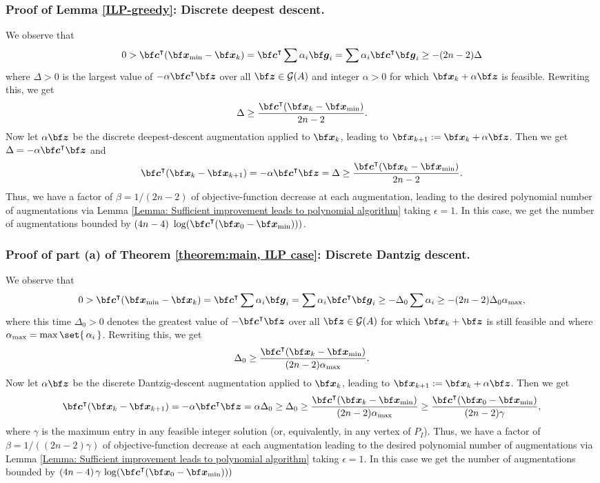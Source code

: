 \documentclass[moor]{informs1hack}              %
\def\Graver{{\mathcal G}}
\def\ve#1{\mathchoice{\mbox{\boldmath$\displaystyle\bf#1$}}
{\mbox{\boldmath$\textstyle\bf#1$}}
{\mbox{\boldmath$\scriptstyle\bf#1$}}
{\mbox{\boldmath$\scriptscriptstyle\bf#1$}}}
\newcommand\vecc{{\ve c}}
\newcommand\veg{{\ve g}}
\newcommand\vex{{\ve x}}
\newcommand\vez{{\ve z}}
\newcommand{\T}{{\intercal}} %
\begin{document}
\subsubsection{Proof of Lemma \ref{ILP-greedy}: Discrete deepest descent.} We observe that
\[
  0>\vecc^\T (\vex_{\min}-\vex_k)
   =\vecc^\T \sum\alpha_i\veg_i
   = \sum\alpha_i\vecc^\T\veg_i
   \geq -(2n-2)\Delta
\]
where $\Delta>0$ is the largest value of $-\alpha\vecc^\T\vez$ over all $\vez\in\Graver(A)$ and integer $\alpha>0$ for which $\vex_k+\alpha\vez$ is feasible. Rewriting this, we get
\[
  \Delta\geq\frac{\vecc^\T (\vex_k-\vex_{\min})}{2n-2}.
\]
Now let $\alpha\vez$ be the discrete deepest-descent augmentation applied to $\vex_k$, leading to $\vex_{k+1}:=\vex_k+\alpha\vez$. Then we get $\Delta=-\alpha\vecc^\T\vez$ and
\[
  \vecc^\T (\vex_k-\vex_{k+1})=-\alpha\vecc^\T\vez=\Delta
  \geq\frac{\vecc^\T (\vex_k-\vex_{\min})}{2n-2}.
\]
Thus, we have a factor of $\beta=1/(2n-2)$ of objective-function decrease at each augmentation, leading to the desired polynomial number of augmentations via Lemma \ref{Lemma: Sufficient improvement leads to polynomial algorithm} taking $\epsilon=1$.
In this case, we get the number of augmentations bounded by $(4n-4)\,\,\log(\vecc^\T (\vex_0-\vex_{\min})))$.

\subsubsection{Proof of part (a) of Theorem \ref{theorem:main, ILP case}: Discrete Dantzig descent.} We observe that
\[
  0>\vecc^\T (\vex_{\min}-\vex_k)
   =\vecc^\T \sum\alpha_i\veg_i
   = \sum\alpha_i\vecc^\T\veg_i
   \geq - \Delta_0 \sum\alpha_i
   \geq -(2n-2)\Delta_0 \alpha_{\max},
\]
where this time $\Delta_0>0$ denotes the greatest value of $-\vecc^\T\vez$ over all $\vez\in\Graver(A)$ for which $\vex_k+\vez$ is still feasible and where $\alpha_{\max}=\max\set{\, \alpha_i\, }$. Rewriting this, we get
\[
  \Delta_0 \geq\frac{\vecc^\T (\vex_k-\vex_{\min})}{(2n-2) \alpha_{\max}}.
\]
Now let $\alpha\vez$ be the discrete Dantzig-descent augmentation  applied to $\vex_k$, leading to $\vex_{k+1}:=\vex_k+\alpha\vez$. Then we get
\[
  \vecc^\T (\vex_k-\vex_{k+1})=-\alpha\vecc^\T\vez=\alpha\Delta_0\geq\Delta_0
  \geq\frac{\vecc^\T (\vex_k-\vex_{\min})}{(2n-2) \alpha_{\max}}
  \geq \frac{\vecc^\T (\vex_0-\vex_{\min})}{(2n-2)\gamma},
\]
where $\gamma$ is the maximum entry in any feasible integer solution (or, equivalently, in any vertex of $P_I$). Thus, we have a factor of $\beta=1/((2n-2) \gamma)$ of objective-function decrease at each augmentation leading to the desired polynomial number of augmentations via Lemma \ref{Lemma: Sufficient improvement leads to polynomial algorithm} taking $\epsilon=1$. In this case we get the number of augmentations bounded by  $(4n-4)\,\gamma \, \log(\vecc^\T (\vex_0-\vex_{\min})))$
\end{document}
